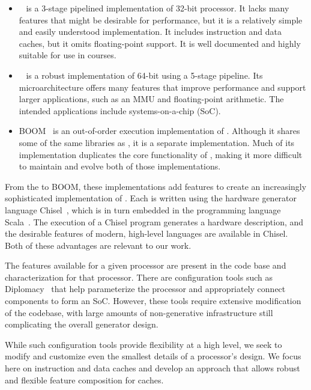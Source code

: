 \documentclass[conference]{IEEEtran}
\begin{document}
\begin{itemize}
   \item \Riscvmini{}~\cite{RvMini} is a 3-stage pipelined implementation of 32-bit \Riscv{} processor. It lacks many features that might be desirable for performance, but it is a relatively simple and easily understood implementation.  It includes instruction and data caches, but it omits floating-point support.  It is well documented and highly suitable for use in courses.
   \item \Rocketchip{}~\cite{chisel:riscv} is a robust implementation of 64-bit \Riscv{} using a 5-stage pipeline.  Its microarchitecture offers many features that improve performance and support larger applications, such as an MMU and floating-point arithmetic.  The intended applications include systems-on-a-chip (SoC).
   \item BOOM~\cite{boom} is an out-of-order execution implementation of \Riscv{}. Although it shares some of the same libraries as \Rocketchip{}, it is a separate implementation.  Much of its implementation duplicates the core functionality of \Rocketchip{}, making it more difficult to maintain and evolve both of those implementations.
\end{itemize}
From the \Riscvmini{} to BOOM, these implementations add features to create an increasingly sophisticated implementation of \Riscv{}.  Each is written using the hardware generator language Chisel~\cite{chisel:book}, which is in turn embedded in the programming language Scala~\cite{scala-overview-tech-report}.  The execution of a Chisel program generates a hardware description, and the desirable features of modern, high-level languages are available in Chisel.  Both of these advantages are relevant to our work.

The features available for a given \Riscv{} processor are present in the code base and characterization for that processor.   There are configuration tools such as Diplomacy~\cite{diplomacy} that help parameterize the \Rocketchip{} processor and appropriately connect components to form an SoC. However, these tools require extensive modification of the codebase, with large amounts of non-generative infrastructure still complicating the overall generator design.

While such configuration tools provide flexibility at a high level, we seek to modify and customize even the smallest details of a processor's design.  We focus here on instruction and data caches and develop an approach that allows robust and flexible feature composition for caches.
\end{document}
